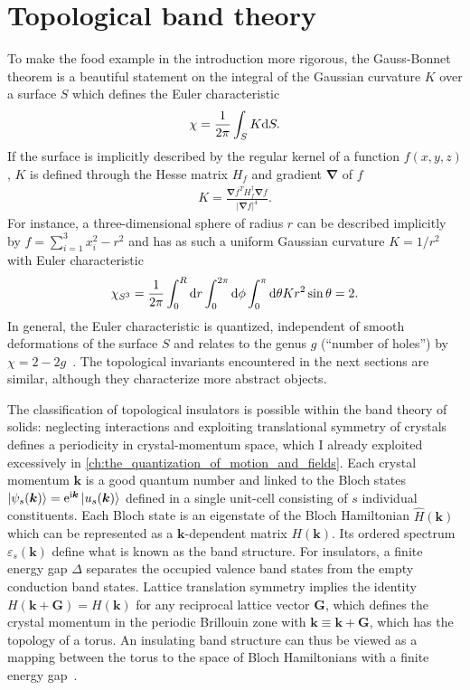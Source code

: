 \section{Topological band theory}
\label{sec:topological_band_theory}
%
%
To make the food example in the introduction more rigorous, the Gauss-Bonnet theorem is a beautiful statement on the integral of the Gaussian curvature $K$ over a surface $S$ which defines the Euler characteristic~\cite{Nakahara1990}
\begin{align}
    \chi = \frac1{2\pi}\int_S K\mathrm d S.
    \label{eq:gauss_bonnet_theorem}
\end{align}
If the surface is implicitly described by the regular kernel of a function $f(x,y,z)$, $K$ is defined through the Hesse matrix $H_f$ and gradient $\bm\nabla$ of $f$~\cite{Goldman2005}
\begin{align}
    K = \frac{\bm\nabla f^T H_f^\dag \bm\nabla f}{|\bm\nabla f|^4}.
\end{align}
For instance, a three-dimensional sphere of radius $r$ can be described implicitly by $f=\sum_{i=1}^3 x_i^2 - r^2$ and has as such a uniform Gaussian curvature $K=1/r^2$ with Euler characteristic
\begin{align}
    \chi_{S^3} = \frac1{2\pi}\int_0^R\mathrm d r\int_0^{2\pi}\mathrm d\phi \int_0^\pi\mathrm d\theta K r^2\sin\theta = 2.
\end{align}
In general, the Euler characteristic is quantized, independent of smooth deformations of the surface $S$ and relates to the genus $g$ (``number of holes'') by $\chi=2-2g$~\cite{Nakahara1990}.
The topological invariants encountered in the next sections are similar, although they characterize more abstract objects.

The classification of topological insulators is possible within the band theory of solids: neglecting interactions and exploiting translational symmetry of crystals defines a periodicity in crystal-momentum space, which I already exploited excessively in \cref{ch:the_quantization_of_motion_and_fields}.
Each crystal momentum ${\bm k}$ is a good quantum number and linked to the Bloch states $\ket{\psi_s(\bm k)}=\mathrm e^{\mathrm i\bm k}\ket{u_s(\bm k)}$ defined in a single unit-cell consisting of $s$ individual constituents.
Each Bloch state is an eigenstate of the Bloch Hamiltonian $\hat H(\bm k)$ which can be represented as a $\bm k$-dependent matrix $H(\bm k)$.
Its ordered spectrum $\varepsilon_s(\bm k)$ define what is known as the band structure.
For insulators, a finite energy gap $\Delta$ separates the occupied valence band states from the empty conduction band states.
Lattice translation symmetry implies the identity $H(\bm k + \bm G) = H(\bm k)$ for any reciprocal lattice vector $\bm G$, which defines the crystal momentum in the periodic Brillouin zone with $\bm k\equiv \bm k+\bm G$, which has the topology of a torus.
An insulating band structure can thus be viewed as a mapping between the torus to the space of Bloch Hamiltonians with a finite energy gap~\cite{Kane2013}.

